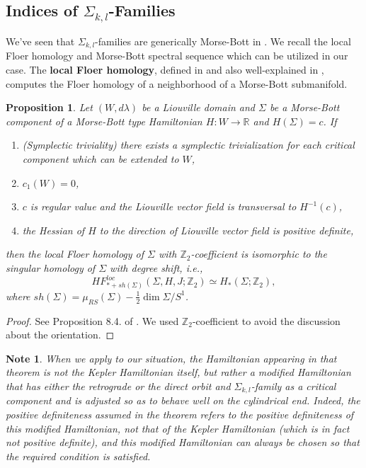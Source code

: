 \documentclass{amsart}
\newcommand{\Z}{\mathbb{Z}}
\newcommand{\R}{\mathbb{R}}
\newcommand{\ld}{\lambda}
\newtheorem{prop}[thm]{Proposition}
\newtheorem{note}[thm]{Note}
\begin{document}
\subsection{Indices of $\Sigma_{k,l}$-Families}

We've seen that $\Sigma_{k,l}$-families are generically Morse-Bott in .
We recall the local Floer homology and Morse-Bott spectral sequence which can be utilized in our case.
The \textbf{local Floer homology}, defined in \cite{Cieliebak_Floer_Hofer_Wysocki_96} and also well-explained in \cite{Kwon_van_Koert_16}, computes the Floer homology of a neighborhood of a Morse-Bott submanifold.
\begin{prop}\label{Proposition - local Floer}
	Let $(W,d\ld)$ be a Liouville domain and $\Sigma$ be a Morse-Bott component of a Morse-Bott type Hamiltonian $H:W\to\R$ and $H(\Sigma)=c$.
	If
		\begin{enumerate}
			\item (Symplectic triviality) there exists a symplectic trivialization for each critical component which can be extended to $W$,
			\item $c_1(W)=0$,
			\item $c$ is regular value and the Liouville vector field is transversal to $H^{-1}(c)$,
			\item the Hessian of $H$ to the direction of Liouville vector field is positive definite,
		\end{enumerate}
	then the local Floer homology of $\Sigma$ with $\Z_2$-coefficient is isomorphic to the singular homology of $\Sigma$ with degree shift, i.e.,
		$$
		HF^{loc}_{*+sh(\Sigma)}(\Sigma,H,J;\Z_2)\simeq H_*(\Sigma;\Z_2),
		$$
	where $sh(\Sigma)=\mu_{RS}(\Sigma)-\frac{1}{2}\dim \Sigma/S^1$.
\end{prop}
\begin{proof}
	See Proposition 8.4. of \cite{Kwon_van_Koert_16}.
	We used $\Z_2$-coefficient to avoid the discussion about the orientation.
\end{proof}

\begin{note}\rm
	When we apply  to our situation, the Hamiltonian appearing in that theorem is not the Kepler Hamiltonian itself, but rather a modified Hamiltonian that has either the retrograde or the direct orbit and $\Sigma_{k,l}$-family as a critical component and is adjusted so as to behave well on the cylindrical end.
	Indeed, the positive definiteness assumed in the theorem refers to the positive definiteness of this modified Hamiltonian, not that of the Kepler Hamiltonian (which is in fact not positive definite), and this modified Hamiltonian can always be chosen so that the required condition is satisfied.
\end{note}
\end{document}
